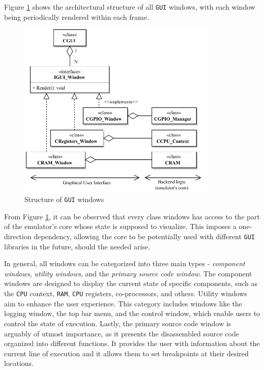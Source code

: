\documentclass[english, ing, kiv, he, iso690numb, pdf]{fasthesis}
\begin{document}
	Figure \ref{Structure of GUI windows} shows the architectural structure of all \texttt{GUI} windows, with each window being periodically rendered within each frame.
	
	\newpage
	
	\begin{figure}[ht]
		\centering
		\includegraphics[width=0.85\textwidth]{img/diagrams/gui_windows.pdf}
		\caption{Structure of \texttt{GUI} windows}
		\label{Structure of GUI windows}
	\end{figure}
	
	From Figure \ref{Structure of GUI windows}, it can be observed that every class windows has access to the part of the emulator's core whose state is supposed to visualize. This imposes a one-direction dependency, allowing the core to be potentially used with different \texttt{GUI} libraries in the future, should the needed arise.
	
	In general, all windows can be categorized into three main types - \textit{component windows}, \textit{utility windows}, and the \textit{primary source code window}. The component windows are designed to display the current state of specific components, such as the \texttt{CPU} context, \texttt{RAM}, \texttt{CPU} registers, co-processors, and others. Utility windows aim to enhance the user experience. This category includes windows like the logging window, the top bar menu, and the control window, which enable users to control the state of execution. Lastly, the primary source code window is arguably of utmost importance, as it presents the disassembled source code organized into different functions. It provides the user with information about the current line of execution and it allows them to set breakpoints at their desired locations. 
	
\end{document}

